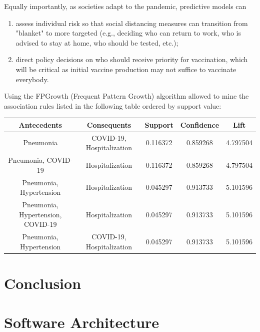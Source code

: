 \documentclass[11pt,a4paper]{article}
\begin{document}
Equally importantly, as societies adapt to the pandemic, predictive models can
\begin{enumerate}
    \item assess individual risk so that social distancing measures can
    transition from "blanket" to more targeted (e.g., deciding who can return to
    work, who is advised to stay at home, who should be tested, etc.);
    \item direct policy decisions on who should receive priority for
    vaccination, which will be critical as initial vaccine production may not
    suffice to vaccinate everybody.
\end{enumerate}
\clearpage
\noindent
Using the FPGrowth (Frequent Pattern Growth) algorithm allowed to mine the
association rules listed in the following table ordered by support value:
\begin{center}
\begin{tabular}{ | c | c | c | c | c | }
    \rowcolor{gray!50}
    \hline
    Antecedents & Consequents & Support & Confidence & Lift\\
    \hline
    Pneumonia & COVID-19, Hospitalization & 0.116372 & 0.859268 & 4.797504\\
    \hline
    Pneumonia, COVID-19 & Hospitalization & 0.116372 & 0.859268 & 4.797504\\
    \hline
    Pneumonia, Hypertension & Hospitalization & 0.045297 & 0.913733 & 5.101596\\
    \hline
    Pneumonia, Hypertension, COVID-19 & Hospitalization & 0.045297 & 0.913733 & 5.101596\\
    \hline
    Pneumonia, Hypertension & COVID-19, Hospitalization & 0.045297 & 0.913733 & 5.101596\\
    \hline
\end{tabular}
\end{center}
\newpage
\section{Conclusion}

\newpage
\section{Software Architecture}

\newpage
\printbibliography
\end{document}

